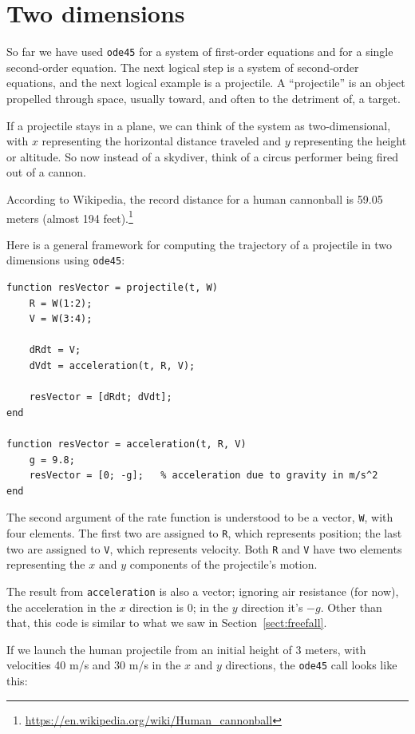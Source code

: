 \documentclass[
]{book}
\begin{document}
\section{Two dimensions}
\label{sect:projectile}

So far we have used {\tt ode45} for a system of first-order
equations and for a single second-order equation.  The next logical
step is a system of second-order equations, and the next logical example
is a projectile.  A ``projectile'' is an object propelled
through space, usually toward,
and often to the detriment of,
a target.

If a projectile stays in a plane, we can think of the system as
two-dimensional, with $x$ representing the horizontal distance
traveled and $y$ representing the height or altitude.  So now
instead of a skydiver, think of a circus performer being fired
out of a cannon.

According to Wikipedia, the record distance for a human cannonball is
59.05 meters (almost 194
feet).\footnote{\url{https://en.wikipedia.org/wiki/Human_cannonball}}

Here is a general framework for computing the trajectory of a projectile
in two dimensions using {\tt ode45}:

\begin{verbatim}
function resVector = projectile(t, W)
    R = W(1:2);
    V = W(3:4);

    dRdt = V;
    dVdt = acceleration(t, R, V);

    resVector = [dRdt; dVdt];
end

function resVector = acceleration(t, R, V)
    g = 9.8;             
    resVector = [0; -g];   % acceleration due to gravity in m/s^2
end
\end{verbatim}

The second argument of the rate function is understood to be a vector,
{\tt W}, with four elements.  The first two are assigned to {\tt R},
which represents position; the last two are assigned to {\tt V}, which
represents velocity. Both {\tt R} and {\tt V} have two elements
representing the $x$ and $y$ components of the projectile's motion.

The result from
{\tt acceleration} is also a vector; ignoring air resistance
(for now), the acceleration in the $x$ direction is 0; in
the $y$ direction it's $-g$.
Other than that, this code is similar to what we saw in
Section~\ref{sect:freefall}.

If we launch the human projectile from an initial height of
3 meters, with velocities 40 m/s and 30 m/s in the $x$ and $y$
directions, the {\tt ode45} call looks like
this:
\end{document}
